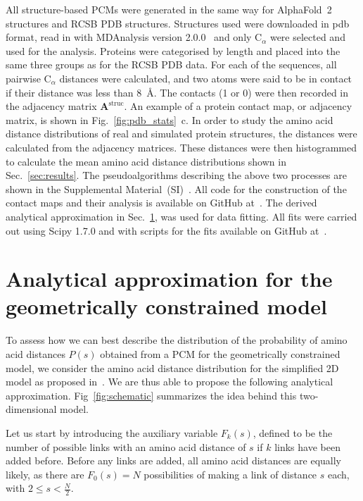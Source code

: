 \documentclass[
reprint,
twocolumn,
amsmath,amssymb,superscriptaddress,aps,
pre]{revtex4-1}
\begin{document}
All structure-based PCMs were generated in the same way for AlphaFold~2 structures and RCSB PDB structures. Structures used were downloaded in pdb format, read in with MDAnalysis version 2.0.0~\cite{gowers2016mdanalysis} and only C$_{\alpha}$ were selected and used for the analysis. Proteins were categorised by length and placed into the same three groups as for the RCSB PDB data. For each of the sequences, all pairwise C$_\alpha$ distances were calculated, and two atoms were said to be in contact if their distance was less than 8~Å. The contacts (1 or 0) were then recorded in the adjacency matrix $\mathbf{A}^{\mathrm{struc}}$. An example of a protein contact map, or adjacency matrix, is shown in Fig.~\ref{fig:pdb_stats}~c. In order to study the amino acid distance distributions of real and simulated protein structures, the distances were calculated from the adjacency matrices. These distances were then histogrammed to calculate the mean amino acid distance distributions shown in Sec.~\ref{sec:results}. The pseudoalgorithms describing the above two processes are shown in the Supplemental Material~(SI)~\cite{SI}. All code for the construction of the contact maps and their analysis is available on GitHub at~\cite{2022sequence}. The derived analytical approximation in Sec.~\ref{sec:theory}, was used for data fitting. All fits were carried out using Scipy 1.7.0 and with scripts for the fits available on GitHub at~\cite{2022sequence}.

\section{Analytical approximation for the geometrically constrained model}\label{sec:theory}

To assess how we can best describe the distribution of the probability of amino acid distances $P(s)$ obtained from a PCM for the geometrically constrained model, we consider the amino acid distance distribution for the simplified 2D model as proposed in~\cite{molkenthin2016scaling}. We are thus able to propose the following analytical approximation. Fig~\ref{fig:schematic} summarizes the idea behind this two-dimensional model.

Let us start by introducing the auxiliary variable $F_k(s)$, defined to be the number of possible links with an amino acid distance of $s$ if $k$ links have been added before. Before any links are added, all amino acid distances are equally likely, as there are $F_0(s)=N$ possibilities of making a link of distance $s$ each, with $2\leq s < \frac{N}{2}$.
\end{document}
